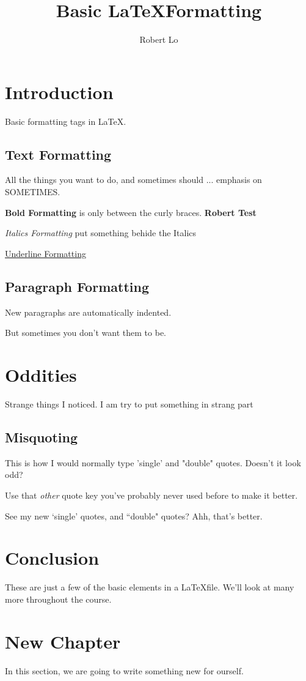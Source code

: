 \documentclass{article}
\title{Basic \LaTeX Formatting}
\author{Robert Lo}
\begin{document}
\maketitle

\section{Introduction}

Basic formatting tags in \LaTeX.

\subsection{Text Formatting}

All the things you want to do, and sometimes should ... emphasis on SOMETIMES.

\textbf{Bold Formatting} is only between the curly braces. \textbf{Robert Test}

\emph{Italics Formatting} put something behide the Italics

\underline{Underline Formatting}

\subsection{Paragraph Formatting}

New paragraphs are automatically indented.

\noindent But sometimes you don't want them to be.

\section{Oddities}

Strange things I noticed. I am try to put something in strang part

\subsection{Misquoting}

This is how I would normally type 'single' and "double" quotes. Doesn't it look odd?

\noindent Use that \emph{other} quote key you've probably never used before to make it better.

\noindent See my new `single' quotes, and ``double" quotes? Ahh, that's better.

\section{Conclusion}

These are just a few of the basic elements in a \LaTeX file. We'll look at many more throughout the course.

\section{New Chapter}

In this section, we are going to write something new for ourself.
\end{document}
